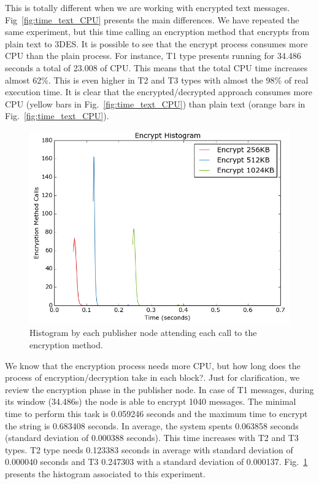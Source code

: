 \documentclass[journal,twoside]{JoPhA}
\begin{document}
This is totally different when we are working with encrypted text messages. Fig~\ref{fig:time_text_CPU} presents the main differences. We have repeated the same experiment, but this time calling an encryption method that encrypts from plain text to 3DES. It is possible to see that the encrypt process consumes more CPU than  the plain process.
For instance, T1 type presents running for 34.486 seconds a total of 23.008 of CPU. This means that the total CPU time increases almost 62\%. This is even higher in T2 and T3 types with almost the 98\% of real execution time. It is clear that the encrypted/decrypted approach consumes more CPU (yellow bars in Fig.~\ref{fig:time_text_CPU}) than plain text (orange bars in Fig.~\ref{fig:time_text_CPU}). 



\begin{figure}[ht]
	\centering
	\includegraphics[width=.5\textwidth]{Outline_images_encryption_decrytiontime4.png}
	\caption{Histogram by each publisher node attending each call to the encryption method.}
	\label{fig:text_encryption_time}
\end{figure}

We know that the encryption process needs more CPU, but how long does the process of encryption/decryption take in each block?. Just for clarification, we review the encryption phase in the publisher node.
In case of T1 messages, during its window (34.486s) the node is able to encrypt 1040 messages. The minimal time to perform this task is 0.059246 seconds and the maximum time to encrypt the string is 0.683408 seconds. In average, the system spents 0.063858 seconds (standard deviation of 0.000388 seconds).
This time increases with T2 and T3 types. T2 type needs 0.123383 seconds in average with standard deviation of 0.000040 seconds and  T3  0.247303 with a standard deviation of 0.000137.
Fig.~\ref{fig:text_encryption_time} presents the histogram associated to this experiment.
\end{document}
